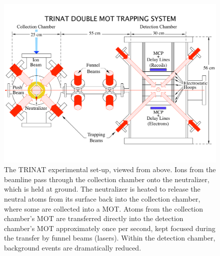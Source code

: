 \begin{figure}[t!h]
	\centering
	\includegraphics[width=.999\linewidth]
	{Figures/DoubleMot5.pdf}
	\caption[The TRINAT experimental set-up, viewed from above]{The TRINAT experimental set-up, viewed from above.  Ions from the beamline pass through the collection chamber onto the neutralizer, which is held at ground.  The neutralizer is heated to release the neutral atoms from its surface back into the collection chamber, where some are collected into a \ac{MOT}.  Atoms from the collection chamber's MOT are transferred directly into the detection chamber's MOT approximately once per second, kept focused during the transfer by funnel beams (lasers).  Within the detection chamber, background events are dramatically reduced.  }
	\label{fig:doublemot}
\end{figure}

